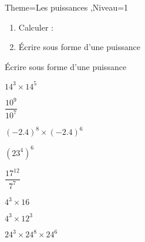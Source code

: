 \documentclass[a4paper,12pt]{article}
\begin{document}
\begin{Maquette}[Fiche]{Theme=Les puissances ,Niveau=1}

\begin{exercice}
\begin{enumerate}
\item Calculer : 

\item \'Ecrire sous forme d'une puissance 


\end{enumerate}
\end{exercice}

\begin{exercice}
\'Ecrire sous forme d'une puissance

\begin{itemize*}
\item[] $14^{3}\times 14^{5}$ 
\item $\dfrac{10^{9}}{10^{7}}$ 
\item $(-2.4)^{8}\times (-2.4)^{6}$ 
\item $(23^{4})^{6}$ 
\item $\dfrac{17^{12}}{7^{7}}$  
\item $4^{3}\times 16$ 
\item $4^{3}\times 12^{3}$ 
\item $24^{3}\times 24^{8}\times 24^{6}$
\end{itemize*}
\end{exercice}


\end{Maquette}
\end{document}
